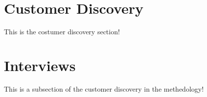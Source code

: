 \section{Customer Discovery\label{methedology:customerDiscovery}}
This is the costumer discovery section!

\section{Interviews\label{sec:methedology:interviews}}
This is a subsection of the customer discovery in the methedology!